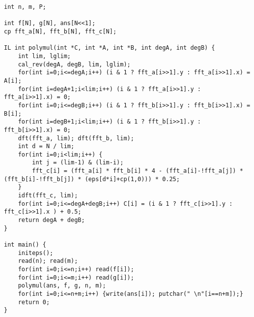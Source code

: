 \documentclass[UTF8]{ctexart}
\begin{document}
\begin{framed}
\begin{lstlisting}
int n, m, P;

int f[N], g[N], ans[N<<1];
cp fft_a[N], fft_b[N], fft_c[N];

IL int polymul(int *C, int *A, int *B, int degA, int degB) {
    int lim, lglim;
    cal_rev(degA, degB, lim, lglim);
    for(int i=0;i<=degA;i++) (i & 1 ? fft_a[i>>1].y : fft_a[i>>1].x) = A[i];
    for(int i=degA+1;i<lim;i++) (i & 1 ? fft_a[i>>1].y : fft_a[i>>1].x) = 0;
    for(int i=0;i<=degB;i++) (i & 1 ? fft_b[i>>1].y : fft_b[i>>1].x) = B[i]; 
    for(int i=degB+1;i<lim;i++) (i & 1 ? fft_b[i>>1].y : fft_b[i>>1].x) = 0;
    dft(fft_a, lim); dft(fft_b, lim);
    int d = N / lim;
    for(int i=0;i<lim;i++) {
        int j = (lim-1) & (lim-i);
        fft_c[i] = (fft_a[i] * fft_b[i] * 4 - (fft_a[i]-!fft_a[j]) * (fft_b[i]-!fft_b[j]) * (eps[d*i]+cp(1,0))) * 0.25;
    }
    idft(fft_c, lim);
    for(int i=0;i<=degA+degB;i++) C[i] = (i & 1 ? fft_c[i>>1].y : fft_c[i>>1].x ) + 0.5;
    return degA + degB;
}

int main() {
    initeps();
    read(n); read(m);
    for(int i=0;i<=n;i++) read(f[i]);
    for(int i=0;i<=m;i++) read(g[i]);
    polymul(ans, f, g, n, m);
    for(int i=0;i<=n+m;i++) {write(ans[i]); putchar(" \n"[i==n+m]);}
    return 0;
}
\end{lstlisting}
\end{framed}
\end{document}
